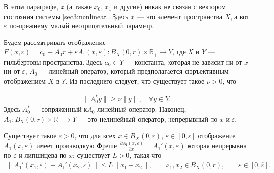 \documentclass[../main.tex]{subfiles}
\begin{document}
В этом параграфе, $x$ (а также $x_0$, $x_1$ и другие) никак не связан с вектором состояния системы \eqref{sec3:nonlinear}.
Здесь $x$ --- это элемент пространства $X$, а вот $\varepsilon$ по-прежнему малый неотрицательный параметр.

Будем рассматривать отображение $F(x, \varepsilon) = a_0 + A_0x + \varepsilon A_1(x,\varepsilon): B_X(0, r) \times \mathbb{R}_+ \rightarrow Y$, где $X$ и $Y$ --- гильбертовы пространства.
Здесь $a_0 \in Y$ --- константа, которая не зависит ни от $x$ ни от $\varepsilon$, $A_0$ --- линейный оператор, который предполагается сюръективным отображением $X$ в $Y$. 
Из последнего следует, что существует такое $\nu > 0$, что

\begin{gather}\label{regular}
	\| A_0^*y\| \geqslant \nu \|y\|, \quad \forall y \in Y.
\end{gather}
Здесь $A_0^* $ --- сопряженный к$A_0$ линейный оператор.
Наконец,  $A_1: B_X(0, r) \times \mathbb{R}_+ \to Y $ --- это нелинейный оператор, непрерывный по $x$ и $\varepsilon$.
\begin{assumption}\label{as:derivative_of_A1}
	Существует такое $\overline{\varepsilon} > 0$, что для всех $x \in B_X(0,r)$, $\varepsilon \in [0, \overline{\varepsilon}]$ отображение $A_1(x, \varepsilon)$  имеет производную Фреше $\frac{\partial A_1(x, \varepsilon)}{\partial x} = A_1'(x, \varepsilon)$  которая непрерывна по $\varepsilon$ и липшицева по $x$: существует $L>0$, такая что
	\begin{gather*}
		\|A_1'(x_1,\varepsilon) - A_1'(x_2,\varepsilon) \| \leqslant L\|x_1-x_2\|, \qquad x_1, x_2 \in B_X(0,r), \qquad \varepsilon \in [0, \overline{\varepsilon}].
	\end{gather*}
\end{assumption}
\end{document}
